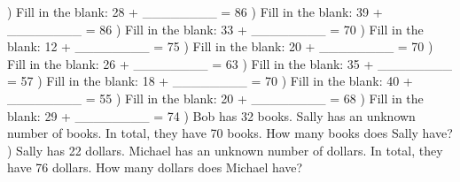 \documentclass{article}%
\begin{document}
) Fill in the blank: 28 + \_\_\_\_\_\_\_\_ = 86%
\newline%
\newline%
) Fill in the blank: 39 + \_\_\_\_\_\_\_\_ = 86%
\newline%
\newline%
) Fill in the blank: 33 + \_\_\_\_\_\_\_\_ = 70%
\newline%
\newline%
) Fill in the blank: 12 + \_\_\_\_\_\_\_\_ = 75%
\newline%
\newline%
) Fill in the blank: 20 + \_\_\_\_\_\_\_\_ = 70%
\newline%
\newline%
) Fill in the blank: 26 + \_\_\_\_\_\_\_\_ = 63%
\newline%
\newline%
) Fill in the blank: 35 + \_\_\_\_\_\_\_\_ = 57%
\newline%
\newline%
) Fill in the blank: 18 + \_\_\_\_\_\_\_\_ = 70%
\newline%
\newline%
) Fill in the blank: 40 + \_\_\_\_\_\_\_\_ = 55%
\newline%
\newline%
) Fill in the blank: 20 + \_\_\_\_\_\_\_\_ = 68%
\newline%
\newline%
) Fill in the blank: 29 + \_\_\_\_\_\_\_\_ = 74%
\newline%
\newline%
) Bob has 32 books. Sally has an unknown number of books. In total, they have 70 books. How many books does Sally have?%
\newline%
\newline%
) Sally has 22 dollars. Michael has an unknown number of dollars. In total, they have 76 dollars. How many dollars does Michael have?%
\end{document}
